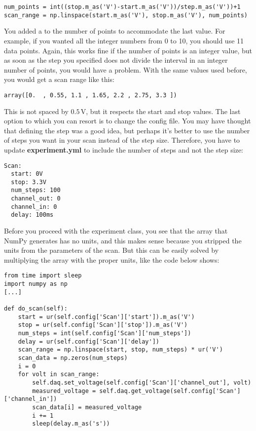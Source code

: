 \begin{verbatim}
num_points = int((stop.m_as('V')-start.m_as('V'))/step.m_as('V'))+1
scan_range = np.linspace(start.m_as('V'), stop.m_as('V'), num_points)
\end{verbatim}

You added a  to the number of points to accommodate the last value. For example, if you wanted all the integer numbers from 0 to 10, you should use 11 data points. Again, this works fine if the number of points is an integer value, but as soon as the step you specified does not divide the interval in an integer number of points, you would have a problem. With the same values used before, you would get a scan range like this:

\begin{verbatim}
array([0.  , 0.55, 1.1 , 1.65, 2.2 , 2.75, 3.3 ])
\end{verbatim}

This is not spaced by $0.5\,\textrm{V}$, but it respects the start and stop values. The last option to which you can resort is to change the config file. You may have thought that defining the step was a good idea, but perhaps it's better to use the number of steps you want in your scan instead of the step size. Therefore, you have to update \textbf{experiment.yml} to include the number of steps and not the step size:

\begin{verbatim}
Scan:
  start: 0V
  stop: 3.3V
  num_steps: 100
  channel_out: 0
  channel_in: 0
  delay: 100ms
\end{verbatim}

Before you proceed with the experiment class, you see that the array that NumPy generates has no units, and this makes sense because you stripped the units from the parameters of the scan. But this can be easily solved by multiplying the array with the proper units, like the code below shows:

\begin{verbatim}
from time import sleep
import numpy as np
[...]

def do_scan(self):
    start = ur(self.config['Scan']['start']).m_as('V')
    stop = ur(self.config['Scan']['stop']).m_as('V')
    num_steps = int(self.config['Scan']['num_steps'])
    delay = ur(self.config['Scan']['delay'])
    scan_range = np.linspace(start, stop, num_steps) * ur('V')
    scan_data = np.zeros(num_steps)
    i = 0
    for volt in scan_range:
        self.daq.set_voltage(self.config['Scan']['channel_out'], volt)
        measured_voltage = self.daq.get_voltage(self.config['Scan']['channel_in'])
        scan_data[i] = measured_voltage
        i += 1
        sleep(delay.m_as('s'))
\end{verbatim}

